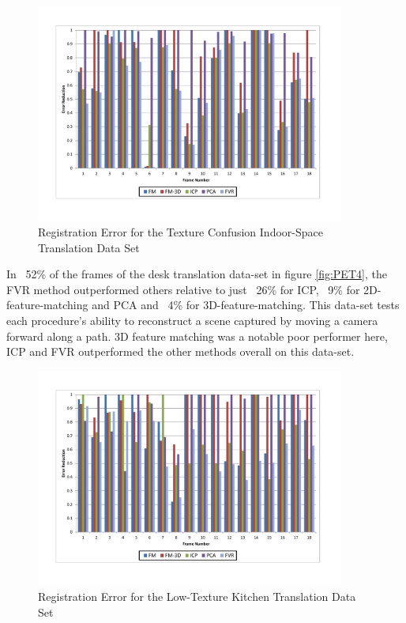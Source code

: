 \begin{figure}[!htb]
\centering
\includegraphics[width=4.0in]{images/results/IndoorSpace_texture_confusion_translation}
\caption{Registration Error for the Texture Confusion Indoor-Space Translation Data Set}
\label{fig:PET5}
\end{figure}

In ~52\% of the frames of the desk translation data-set in figure \ref{fig:PET4}, the FVR method outperformed others relative to just ~26\% for ICP, ~9\% for 2D-feature-matching and PCA and ~4\% for 3D-feature-matching. This data-set tests each procedure's ability to reconstruct a scene captured by moving a camera forward along a path. 3D feature matching was a notable poor performer here, ICP and FVR outperformed the other methods overall on this data-set. \\


\begin{figure}[!htb]
\centering
\includegraphics[width=4.0in]{images/results/Kitchen_LittleTexture_Pan}
\caption{Registration Error for the Low-Texture Kitchen Translation Data Set}
\label{fig:PET6}
\end{figure}


